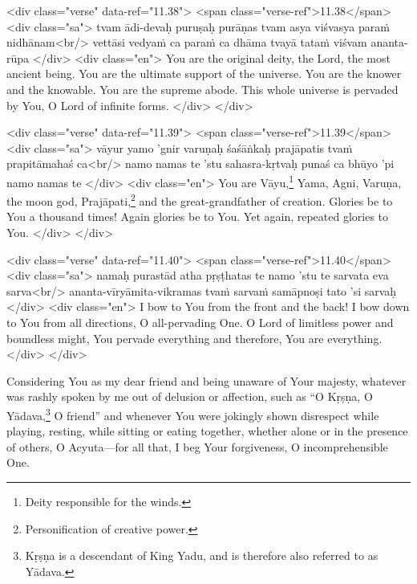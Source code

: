 \begin{html}
<div class="verse" data-ref="11.38">
  <span class="verse-ref">11.38</span>
  <div class="sa">
    tvam ādi-devaḥ puruṣaḥ purāṇas tvam asya viśvasya paraṁ nidhānam<br/>
    vettāsi vedyaṁ ca paraṁ ca dhāma tvayā tataṁ viśvam ananta-rūpa
  </div>
  <div class="en">
    You are the original deity, the Lord, the most ancient being. You are the ultimate support of the universe. You are the knower and the knowable. You are the supreme abode. This whole universe is pervaded by You, O Lord of infinite forms.
  </div>
</div>
\end{html}



\begin{html}
<div class="verse" data-ref="11.39">
  <span class="verse-ref">11.39</span>
  <div class="sa">
    vāyur yamo ’gnir varuṇaḥ śaśāṅkaḥ prajāpatis tvaṁ prapitāmahaś ca<br/>
    namo namas te ’stu sahasra-kṛtvaḥ punaś ca bhūyo ’pi namo namas te
  </div>
  <div class="en">
    You are Vāyu,\footnote{Deity responsible for the winds.} Yama, Agni, Varuṇa, the moon god, Prajāpati,\footnote{Personification of creative power.} and the great-grandfather of creation. Glories be to You a thousand times! Again glories be to You. Yet again, repeated glories to You.
  </div>
</div>
\end{html}



\begin{html}
<div class="verse" data-ref="11.40">
  <span class="verse-ref">11.40</span>
  <div class="sa">
    namaḥ purastād atha pṛṣṭhatas te namo ’stu te sarvata eva sarva<br/>
    ananta-vīryāmita-vikramas tvaṁ sarvaṁ samāpnoṣi tato ’si sarvaḥ
  </div>
  <div class="en">
    I bow to You from the front and the back! I bow down to You from all directions, O all-pervading One. O Lord of limitless power and boundless might, You pervade everything and therefore, You are everything.
  </div>
</div>
\end{html}


{Considering You as my dear friend and being unaware of Your majesty, whatever was rashly spoken by me out of delusion or affection, such as \enquote{O Kṛṣṇa, O Yādava,\footnote{Kṛṣṇa is a descendant of King Yadu, and is therefore also referred to as Yādava.} O friend}  and whenever You were jokingly shown disrespect while playing, resting, while sitting or eating together, whether alone or in the presence of others, O Acyuta---for all that, I beg Your forgiveness, O incomprehensible One.}



